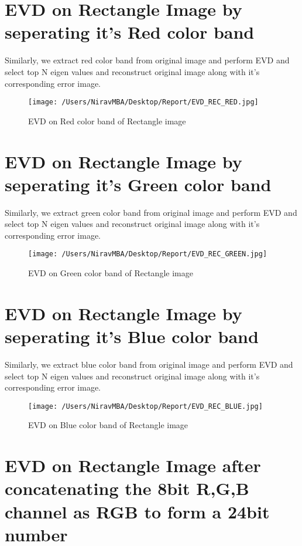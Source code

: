 \documentclass[12pt]{report}
\begin{document}
\section{EVD on Rectangle Image by seperating it's Red color band}

Similarly, we extract red color band from original image and perform EVD and select top N eigen values and reconstruct original image along with it's corresponding error image.\\


\begin{figure}[H]
	
	\texttt{[image: /Users/NiravMBA/Desktop/Report/EVD\_REC\_RED.jpg]}
	\caption{EVD on Red color band of Rectangle image}
\end{figure}
\cleardoublepage
\section{EVD on Rectangle Image by seperating it's Green color band}
Similarly, we extract green color band from original image and perform EVD and select top N eigen values and reconstruct original image along with it's corresponding error image.\\


\begin{figure}[H]
	
	\texttt{[image: /Users/NiravMBA/Desktop/Report/EVD\_REC\_GREEN.jpg]}
	\caption{EVD on Green color band of Rectangle image}
\end{figure}
\cleardoublepage

\section{EVD on Rectangle Image by seperating it's Blue color band}
Similarly, we extract blue color band from original image and perform EVD and select top N eigen values and reconstruct original image along with it's corresponding error image.\\


\begin{figure}[H]
	
	\texttt{[image: /Users/NiravMBA/Desktop/Report/EVD\_REC\_BLUE.jpg]}
	\caption{EVD on Blue color band of Rectangle image}
\end{figure}

\cleardoublepage

\section{EVD on Rectangle Image after concatenating the 8bit R,G,B channel as RGB to form a 24bit number }
\end{document}

